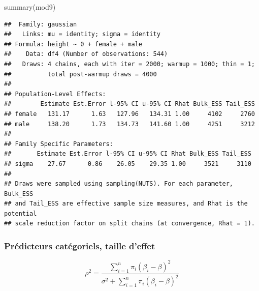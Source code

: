 \documentclass[
  a4paper,11pt,twoside,onecolumn,openright,final,oldfontcommands]{memoir}
\newenvironment{Shaded}{\begin{snugshade}}{\end{snugshade}}
\newcommand{\CommentTok}[1]{\textcolor[rgb]{0.56,0.35,0.01}{\textit{#1}}}
\newcommand{\DecValTok}[1]{\textcolor[rgb]{0.00,0.00,0.81}{#1}}
\newcommand{\FunctionTok}[1]{\textcolor[rgb]{0.00,0.00,0.00}{#1}}
\newcommand{\NormalTok}[1]{#1}
\newcommand{\OtherTok}[1]{\textcolor[rgb]{0.56,0.35,0.01}{#1}}
\newcommand{\SpecialCharTok}[1]{\textcolor[rgb]{0.00,0.00,0.00}{#1}}
\theoremstyle{definition}
\theoremstyle{definition}
\theoremstyle{definition}
\theoremstyle{definition}
\theoremstyle{remark}
\begin{document}
\begin{Shaded}
\begin{Highlighting}[]
\FunctionTok{summary}\NormalTok{(mod9)}
\end{Highlighting}
\end{Shaded}

\begin{verbatim}
##  Family: gaussian 
##   Links: mu = identity; sigma = identity 
## Formula: height ~ 0 + female + male 
##    Data: df4 (Number of observations: 544) 
##   Draws: 4 chains, each with iter = 2000; warmup = 1000; thin = 1;
##          total post-warmup draws = 4000
## 
## Population-Level Effects: 
##        Estimate Est.Error l-95% CI u-95% CI Rhat Bulk_ESS Tail_ESS
## female   131.17      1.63   127.96   134.31 1.00     4102     2760
## male     138.20      1.73   134.73   141.60 1.00     4251     3212
## 
## Family Specific Parameters: 
##       Estimate Est.Error l-95% CI u-95% CI Rhat Bulk_ESS Tail_ESS
## sigma    27.67      0.86    26.05    29.35 1.00     3521     3110
## 
## Draws were sampled using sampling(NUTS). For each parameter, Bulk_ESS
## and Tail_ESS are effective sample size measures, and Rhat is the potential
## scale reduction factor on split chains (at convergence, Rhat = 1).
\end{verbatim}

\hypertarget{pruxe9dicteurs-catuxe9goriels-taille-deffet}{%
\subsubsection{Prédicteurs catégoriels, taille d'effet}\label{pruxe9dicteurs-catuxe9goriels-taille-deffet}}

\[
\rho^{2} = \dfrac{\sum_{i=1}^{n} \pi_{i}(\beta_{i} - \beta)^{2}}{\sigma^{2} + \sum_{i = 1}^{n} \pi_{i}(\beta_{i} - \beta)^{2}}
\]

\begin{Shaded}
\end{Shaded}
\end{document}

